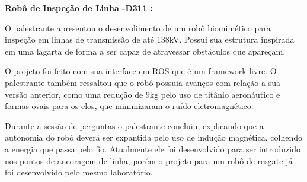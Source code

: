 
\textbf{Robô de Inspeção de Linha -D311 :}

O palestrante apresentou o desenvolimento de um robô biomimético para inspeção
em linhas de transmissão de até 138kV. Possui sua estrutura inspirada em uma
lagarta de forma a ser capaz de atravessar obstáculos que apareçam.

O projeto foi feito com sua interface em ROS que é um framework livre. O
palestrante também ressaltou que o robô possuia avanços com relação a sua versão
anterior, como uma redução de 9kg pelo uso de titânio aeronáutico e formas ovais
para os elos, que minimizaram o ruído eletromagnético. 

Durante a sessão de perguntas o palestrante concluiu, explicando que a autonomia
do robô deverá ser expantida pelo uso de indução magnética, colhendo a energia
que passa pelo fio. Atualmente ele foi desenvolvido para ser introduzido nos
pontos de ancoragem de linha, porém o projeto para um robô de resgate já
foi desenvolvido pelo mesmo laboratório.
